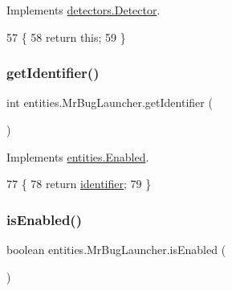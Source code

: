 Implements \mbox{\hyperlink{interfacedetectors_1_1_detector_a0b2ecb13c6db0ff6a02e57c193bcf8b2}{detectors.\+Detector}}.


\begin{DoxyCode}
57                            \{
58         \textcolor{keywordflow}{return} \textcolor{keyword}{this};
59     \}
\end{DoxyCode}
\mbox{\label{classentities_1_1_mr_bug_launcher_ab08c44ece87cd133b59f95ab78ca9d44}} 
\subsubsection{\texorpdfstring{get\+Identifier()}{getIdentifier()}}
{\footnotesize\ttfamily int entities.\+Mr\+Bug\+Launcher.\+get\+Identifier (\begin{DoxyParamCaption}{ }\end{DoxyParamCaption})\hspace{0.3cm}{\ttfamily [inline]}}



Implements \mbox{\hyperlink{interfaceentities_1_1_enabled_afbf595b80729c70944d508375ea7a5fd}{entities.\+Enabled}}.


\begin{DoxyCode}
77                                \{
78        \textcolor{keywordflow}{return} \mbox{\hyperlink{classentities_1_1_mr_bug_launcher_aa9cb24696faf408110cd4bcbfb0dd6e0}{identifier}};
79     \}
\end{DoxyCode}
\mbox{\label{classentities_1_1_mr_bug_launcher_a41dc8f25473307d087c9066562566059}} 
\subsubsection{\texorpdfstring{is\+Enabled()}{isEnabled()}}
{\footnotesize\ttfamily boolean entities.\+Mr\+Bug\+Launcher.\+is\+Enabled (\begin{DoxyParamCaption}{ }\end{DoxyParamCaption})\hspace{0.3cm}{\ttfamily [inline]}}



